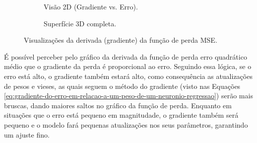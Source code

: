 \begin{figure}[h!]
\begin{subfigure}[b]{0.48\textwidth}
        \caption{Visão 2D (Gradiente vs. Erro).} %
        \label{fig:mse-derivada-2d}
    \end{subfigure}
    \hfill %
    \begin{subfigure}[b]{0.48\textwidth}
        \centering
        \caption{Superfície 3D completa.} %
        \label{fig:mse-derivada-3d}
    \end{subfigure}

    \caption{Visualizações da derivada (gradiente) da função de perda MSE.}
    \label{fig:mse-derivada} %
\end{figure}

É possível perceber pelo gráfico da derivada da função de perda erro quadrático médio que o gradiente da perda é proporcional ao erro. Seguindo essa lógica, se o erro está alto, o gradiente também estará alto, como consequência as atualizações de pesos e vieses, as quais seguem o método do gradiente (visto nas Equações \ref{eq:gradiente-do-erro-em-relacao-a-um-peso-de-um-neuronio-regressao}) serão mais bruscas, dando maiores saltos no gráfico da função de perda. Enquanto em situações que o erro está pequeno em magnitudade, o gradiente também será pequeno e o modelo fará pequenas atualizações nos seus parâmetros, garantindo um ajuste fino.

